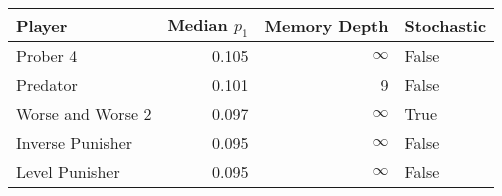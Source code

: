 \begin{tabular}{lrrl}
\toprule
            Player &  Median $p_1$ &  Memory Depth & Stochastic \\
\midrule
          Prober 4 &         0.105 &            \(\infty\) &      False \\
          Predator &         0.101 &             9 &      False \\
 Worse and Worse 2 &         0.097 &            \(\infty\) &       True \\
  Inverse Punisher &         0.095 &            \(\infty\) &      False \\
    Level Punisher &         0.095 &            \(\infty\) &      False \\
\bottomrule
\end{tabular}
